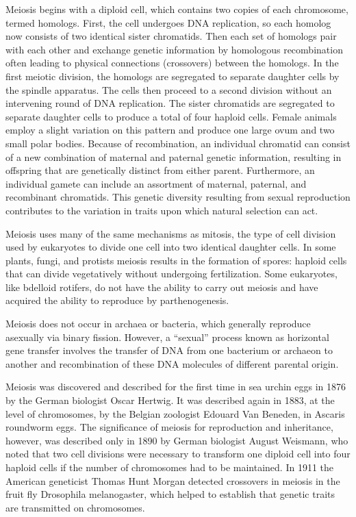 Meiosis begins with a diploid cell, which contains two copies of each chromosome, termed homologs. First, the cell undergoes DNA replication, so each homolog now consists of two identical sister chromatids. Then each set of homologs pair with each other and exchange genetic information by homologous recombination often leading to physical connections (crossovers) between the homologs. In the first meiotic division, the homologs are segregated to separate daughter cells by the spindle apparatus. The cells then proceed to a second division without an intervening round of DNA replication. The sister chromatids are segregated to separate daughter cells to produce a total of four haploid cells. Female animals employ a slight variation on this pattern and produce one large ovum and two small polar bodies. Because of recombination, an individual chromatid can consist of a new combination of maternal and paternal genetic information, resulting in offspring that are genetically distinct from either parent. Furthermore, an individual gamete can include an assortment of maternal, paternal, and recombinant chromatids. This genetic diversity resulting from sexual reproduction contributes to the variation in traits upon which natural selection can act.

Meiosis uses many of the same mechanisms as mitosis, the type of cell division used by eukaryotes to divide one cell into two identical daughter cells. In some plants, fungi, and protists meiosis results in the formation of spores: haploid cells that can divide vegetatively without undergoing fertilization. Some eukaryotes, like bdelloid rotifers, do not have the ability to carry out meiosis and have acquired the ability to reproduce by parthenogenesis.

Meiosis does not occur in archaea or bacteria, which generally reproduce asexually via binary fission. However, a ``sexual'' process known as horizontal gene transfer involves the transfer of DNA from one bacterium or archaeon to another and recombination of these DNA molecules of different parental origin.

Meiosis was discovered and described for the first time in sea urchin eggs in 1876 by the German biologist Oscar Hertwig. It was described again in 1883, at the level of chromosomes, by the Belgian zoologist Edouard Van Beneden, in Ascaris roundworm eggs. The significance of meiosis for reproduction and inheritance, however, was described only in 1890 by German biologist August Weismann, who noted that two cell divisions were necessary to transform one diploid cell into four haploid cells if the number of chromosomes had to be maintained. In 1911 the American geneticist Thomas Hunt Morgan detected crossovers in meiosis in the fruit fly Drosophila melanogaster, which helped to establish that genetic traits are transmitted on chromosomes.

